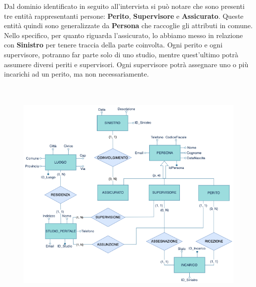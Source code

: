 \documentclass[a4paper,12pt]{report}
\begin{document}
\clearpage

Dal dominio identificato in seguito all’intervista si può notare che sono presenti tre entità rappresentanti persone: \textbf{Perito}, \textbf{Supervisore} e \textbf{Assicurato}. Queste entità quindi sono generalizzate da \textbf{Persona} che raccoglie gli attributi in comune.
Nello specifico, per quanto riguarda l’assicurato, lo abbiamo messo in relazione con \textbf{Sinistro} per tenere traccia della parte coinvolta.
Ogni perito e ogni supervisore, potranno far parte solo di uno studio, mentre quest'ultimo potrà assumere diversi periti e supervisori.
Ogni supervisore potrà assegnare uno o più incarichi ad un perito, ma non necessariamente.
\\
\\
\\
\begin{figure}[ht]
    \begin{center}
        \centering
        \includegraphics[width=\textwidth]{img/StudioPeritale.png}
    \end{center}
\end{figure}
\clearpage
\end{document}
